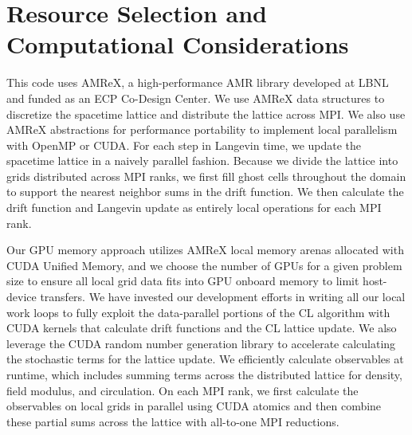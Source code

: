 \documentclass[onecolumn, 12pt]{article}
\begin{document}

\section{Resource Selection and Computational Considerations}
This code uses AMReX, a high-performance AMR library developed at LBNL and funded as an ECP Co-Design Center. We use AMReX data structures to discretize the spacetime lattice and distribute the lattice across MPI. We also use AMReX abstractions for performance portability to implement local parallelism with OpenMP or CUDA.
For each step in Langevin time, we update the spacetime lattice in a naively parallel fashion.
Because we divide the lattice into grids distributed across MPI ranks, we first fill ghost cells throughout the domain to support the nearest neighbor sums in the drift function.
We then calculate the drift function and Langevin update as entirely local operations for each MPI rank.

Our GPU memory approach utilizes AMReX local memory arenas allocated with CUDA Unified Memory, and we choose the number of GPUs for a given problem size to ensure all local grid data fits into GPU onboard memory to limit host-device transfers.
We have invested our development efforts in writing all our local work loops to fully exploit the data-parallel portions of the CL algorithm with CUDA kernels that calculate drift functions and the CL lattice update. We also leverage the CUDA random number generation library to accelerate calculating the stochastic terms for the lattice update.
We efficiently calculate observables at runtime, which includes summing terms across the distributed lattice for density, field modulus, and circulation. On each MPI rank, we first calculate the observables on local grids in parallel using CUDA atomics and then combine these partial sums across the lattice with all-to-one MPI reductions.
\end{document}

